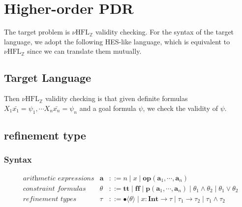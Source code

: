 \documentclass[runningheads]{llncs}
\newcommand \nhz{\(\nu\text{HFL}_\mathbb{Z}\)}
\newcommand \true {\textbf{tt}}
\newcommand \false {\textbf{ff}}
\newcommand \predicate {\textbf{p}}
\newcommand \arith {\textbf{a}}
\newcommand \operator {\mathbin{\textbf{op}}}
\newcommand \atom {A}
\newcommand \goal {G}
\newcommand \definite {D}
\newcommand \stypeint {\textbf{Int}}
\newcommand \stypebool {\bullet}
\newcommand \constraint {\theta}
\newcommand \refty {\tau}
\newcommand \typeint[1]{{#1} : \stypeint}
\newcommand \typebool[1]{\stypebool \langle #1 \rangle}
\begin{document}
\section{Higher-order PDR}

The target problem is \nhz{} validity checking.
For the syntax of the target language, we adopt the following HES-like language,
which is equivalent to \nhz{} since we can translate them mutually.

\subsection{Target Language}

%


Then \nhz{} validity checking is that given definite formulas
\( X_1 \bar{x_1} = \psi_1, \cdots X_n \bar{x_n} =  \psi_n \)
and a goal formula \( \psi \),
we check the validity of \( \psi \).

\subsection{refinement type}

\subsubsection{Syntax}

\begin{align*}
  &\textit{arithmetic expressions} &
  \arith &::=
  n
  \mid
  x
  \mid
  \operator(\arith_1, \cdots, \arith_n)
  \\
  &\textit{constraint formulas}&
  \constraint &::=
  \true
  \mid \false
  \mid \predicate(\arith_1, \cdots, \arith_n)
  \mid \constraint_1 \land \constraint_2
  \mid \constraint_1 \lor \constraint_2
  \\
  &\textit{refinement types}&
  \refty &::=
  \typebool{\theta}
  \mid \typeint{x} \rightarrow \refty
  \mid \refty_1 \rightarrow \refty_2
  \mid \refty_1 \land \refty_2
\end{align*}
\end{document}
